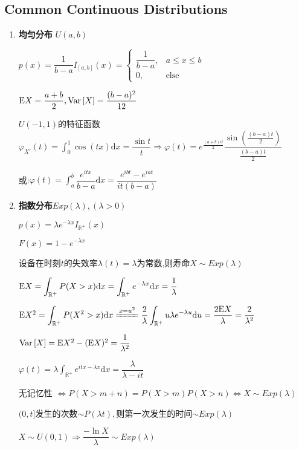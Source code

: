     \subsection{Common Continuous Distributions}
    \begin{enumerate}
      \item \textbf{均匀分布} $U(a,b)$

        $p(x) = \dfrac{1}{b-a}I_{[a,b]}(x) = \left \{ \begin{matrix}\dfrac{1}{b-a}, & a\le x \le b \\0, &  \text{else}\end{matrix}\right.$

        $\text{E}X = \dfrac{a+b}{2}, \text{Var}\left[X\right] = \dfrac{(b-a)^2}{12}$

        $ U(-1,1)$的特征函数$\varphi_{X'}(t)=\int_{0}^1{\cos(tx)\mathrm{d}x} = \dfrac{\sin t}{t}\Rightarrow \varphi(t) =
      e^{\frac{(a+b)it}{2}}\dfrac{\sin(\frac{(b-a)t}{2})}{\frac{(b-a)t}{2}}$

      或:$ \varphi(t) = \int_{a}^b{\dfrac{e^{itx}}{b-a}\mathrm{d}x} = \dfrac{e^{ibt}-e^{iat}}{it(b-a)}$

    \item \textbf{指数分布}$Exp(\lambda),(\lambda > 0)$

      $p(x) = \lambda e^{-\lambda x}I_{\mathbb{R^+}}(x)$

      $F(x) = 1-e^{-\lambda x}$

      设备在时刻$t$的失效率$\lambda(t) = \lambda$为常数,则寿命$X\sim Exp(\lambda)$

      $\Ex{X} = \int_{\mathbb{R^+}}{P(X>x)\mathrm{d}x} = \int_{\mathbb{R^+}}{e^{-\lambda x}\mathrm{d}x} = \dfrac{1}{\lambda}$

      $ \Ex{X^2} = \int_{\mathbb{R^+}}{P(X^2 > x)\mathrm{d}x} \xlongequal{x = u^2} \dfrac{2}{\lambda}\int_{\mathbb{R^+}}{u\lambda e^{-\lambda u}\mathrm{d}u}
      = \dfrac{2\Ex{X}}{\lambda} = \dfrac{2}{\lambda^2}$

      $\text{Var}\left[X\right] = \text{E}X^2 - (\text{E}X)^2 = \dfrac{1}{\lambda^2}$

      $ \varphi(t) = \lambda\int_{\mathbb{R}^+}e^{itx-\lambda x}\mathrm{d}x=\dfrac{\lambda}{\lambda-it}$

      无记忆性 $\Leftrightarrow P(X>m+n) = P(X>m)P(X>n)\Leftrightarrow X\sim Exp(\lambda)$

          $(0,t]$发生的次数$\sim P(\lambda t),$则第一次发生的时间$\sim Exp(\lambda)$

          $ X\sim U(0,1)\Rightarrow  \dfrac{-\ln X}{\lambda}\sim Exp(\lambda)$


\end{enumerate}
